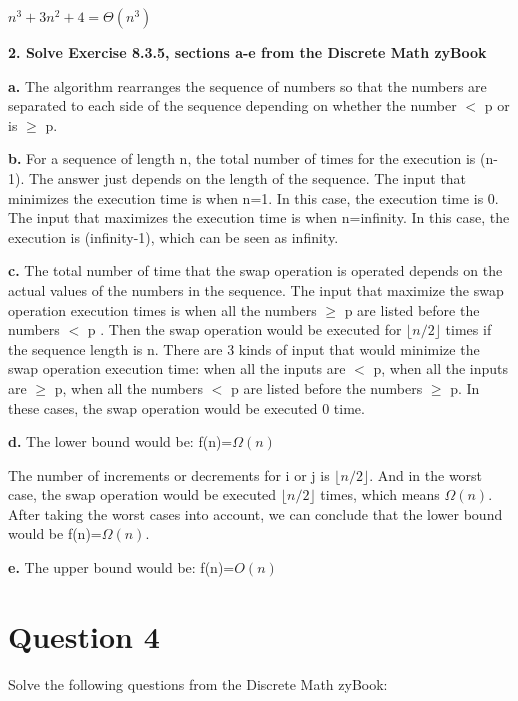\documentclass[11pt]{article}
\begin{document}
	$n^3+3n^2+4=\Theta (n^3)$
	
	\vspace{10mm}
	\textbf{2. Solve Exercise 8.3.5, sections a-e from the Discrete Math zyBook}
	
	\textbf{a.} The algorithm rearranges the sequence of numbers so that the numbers are separated to each side of the sequence depending on whether the number $<$ p or is $\geq$ p.
	
	\vspace{10mm}
	\textbf{b.}
	For a sequence of length n, the total number of times for the execution is (n-1). The answer just depends on the length of the sequence. The input that minimizes the execution time is when n=1. In this case, the execution time is 0. The input that maximizes the execution time is when n=infinity. In this case, the execution is (infinity-1), which can be seen as infinity.
	
	\vspace{10mm}
	\textbf{c.}
	The total number of time that the swap operation is operated depends on the actual values of the numbers in the sequence. The input that maximize the swap operation execution times is when all the numbers $\geq$ p are listed before the numbers $<$ p . Then the swap operation would be executed for $\lfloor n/2\rfloor$ times if the sequence length is n. There are 3 kinds of input that would minimize the swap operation execution time: when all the inputs are $<$ p, when all the inputs are $\geq$ p, when all the numbers $<$ p are listed before the numbers $\geq$ p. In these cases, the swap operation would be executed 0 time. 
	
	\vspace{10mm}
	\textbf{d.}
	The lower bound would be: f(n)=$\Omega (n)$
	
	The number of increments or decrements for i or j is $\lfloor n/2\rfloor$. And in the worst case, the swap operation would be executed $\lfloor n/2\rfloor$ times, which means $\Omega (n)$. After taking the worst cases into account, we can conclude that the lower bound would be f(n)=$\Omega (n)$. 
	
	\vspace{10mm}
	\textbf{e.}
	The upper bound would be: f(n)=${O} (n)$
	
	\newpage
	\section*{Question 4}
	Solve the following questions from the Discrete Math zyBook:
	
\end{document}

